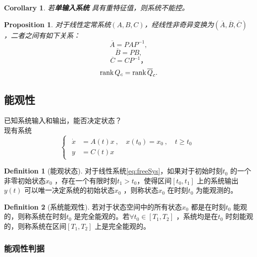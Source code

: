 \documentclass[14pt,a4paper]{article}
\theoremstyle{plain}
\theoremstyle{definition}
\newtheorem*{dfn}{Definition}
\theoremstyle{remark}
\theoremstyle{plain}
\theoremstyle{plain}
\newtheorem{cor}[thm]{Corollary}
\theoremstyle{plain}
\newtheorem{prop}[thm]{Proposition}
\theoremstyle{definition}
\theoremstyle{remark}
\numberwithin{equation}{section}
\begin{document}
				\begin{cor}  
					若\textbf{单输入系统} 具有重特征值，则系统不能控。
				\end{cor} 

				\begin{prop}  
				\label{prop:能控性在非奇异线性线性变换下的属性}
					对于线性定常系统$\left( A,B,C \right)$，经线性非奇异变换为$\left( \overline{A},\overline{B},\overline{C} \right)$ ，二者之间有如下关系：
					\[
					\overline{A}=PAP^{-1}
					,\] 
					\[
					\overline{B} = PB
					,\] 
					\[
					\overline{C} = CP^{-1}
					，\]
					\[
					\mathop{\textnormal{rank}} Q_c = \mathop{\textnormal{rank}} \overline{Q}_c
					.\] 
				\end{prop} 


		\subsection{能观性}%
		\label{sub:能观性}
		
			已知系统输入和输出，能否决定状态？ \\ 
			现有系统
			\begin{equation}
			\label{eq:freeSys}
				\begin{cases}
					\begin{aligned}
						\dot x &= A(t)x\ , \quad x(t_0) = x_0 \ , \quad t\ge t_0 \\ 
						y &= C(t)x
					\end{aligned}  
				\end{cases} 
			\end{equation} 
		
			\begin{dfn}[能观状态]  
			\label{dfn:能观状态}
			对于线性系统\eqref{eq:freeSys}，如果对于初始时刻$t_0$ 的一个非零初始状态$x_0$ ，存在一个有限时刻$t_1>t_0$，使得区间$[t_0, t_1]$ 上的系统输出$y(t)$ 可以唯一决定系统的初始状态$x_0$ ，则称状态$x_0$ 在时刻$t_0$ 为能观测的。				
			\end{dfn} 

			\begin{dfn}[系统能观性]  
			\label{dfn:系统能观性}
				若对于状态空间中的所有状态$x_0$ 都是在时刻$t_0$ 能观的，则称系统在时刻$t_0$ 是完全能观的。若$\forall t_0\in [T_1,T_2]$ ，系统均是在$t_0$ 时刻能观的，则称系统在区间$[T_1, T_2]$ 上是完全能观的。	
			\end{dfn} 

			\subsubsection{能观性判据}%
			\label{ssub:能观性判据}
			
\end{document}
